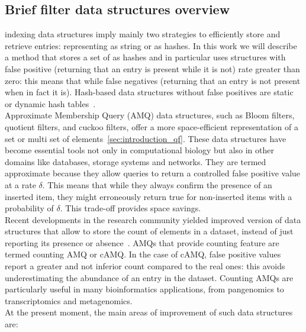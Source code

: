 \subsection{Brief filter data structures overview}
\kmer indexing data structures imply mainly two strategies to efficiently store and retrieve entries: representing \kmers as string or as hashes\cite{marchet2024kmersets}. In this work we will describe a method that stores a set of \kmer as hashes and in particular uses structures with false positive (returning that an entry is present while it is not) rate greater than zero: this means that while false negatives (returning that an entry is not present when in fact it is). Hash-based data structures without false positives are static or dynamic hash tables~\cite{sshash}.\\
Approximate Membership Query (\gls{AMQ}) data structures, such as Bloom filters, quotient filters, and cuckoo filters, offer a more space-efficient representation of a set or multi set of elements~\ref{sec:introduction_qf}. These data structures have become essential tools not only in computational biology but also in other domains like databases, storage systems and networks. They are termed approximate because they allow queries to return a controlled false positive value at a rate $\delta$. This means that while they always confirm the presence of an inserted item, they might erroneously return true for non-inserted items with a probability of $\delta$. This trade-off provides space savings.\\
Recent developments in the \kmer research community yielded improved version of data structures that allow to store the count of elements in a dataset, instead of just reporting its presence or absence~\cite{squeakr,pandey,cqf,comin_count,sshash}. AMQs that provide counting feature are termed counting AMQ or \gls{cAMQ}. In the case of cAMQ, false positive values report a greater and not inferior count compared to the real ones: this avoids underestimating the abundance of an entry in the dataset. Counting AMQs are particularly useful in many bioinformatics applications, from pangenomics to transcriptomics and metagenomics.\\
At the present moment, the main areas of improvement of such data structures are:
